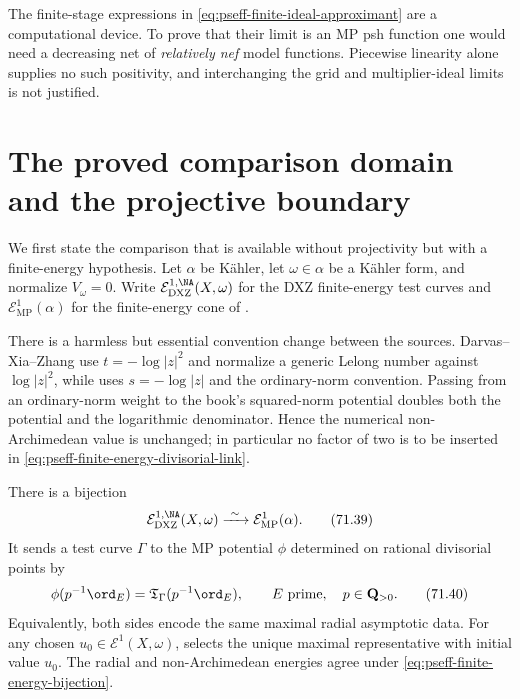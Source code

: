 \begin{remark}\label{rem:pseff-pl-limit-firewall}
The finite-stage expressions in \eqref{eq:pseff-finite-ideal-approximant}
are a
computational device.  To prove that their limit is an MP psh function
one would need a decreasing net of \emph{relatively nef} model
functions.  Piecewise linearity alone supplies no such positivity, and
interchanging the grid and multiplier-ideal limits is not justified.
\end{remark}

\section{The proved comparison domain and the projective boundary}

We first state the comparison that is available without projectivity but
with a finite-energy hypothesis.  Let \(\alpha\) be K\"ahler, let
\(\omega\in\alpha\) be a K\"ahler form, and normalize
\(V_\omega=0\).  Write
\(\mathcal E^{1,\NA}_{\mathrm{DXZ}}(X,\omega)\) for the DXZ
finite-energy test curves and \(\mathcal E^1_{\mathrm{MP}}(\alpha)\) for
the finite-energy cone of .

There is a harmless but essential convention change between the sources.
Darvas--Xia--Zhang use \(t=-\log|z|^2\) and normalize a generic Lelong
number against \(\log|z|^2\), while \cite{MP24} uses
\(s=-\log|z|\) and the ordinary-norm convention.  Passing from an
ordinary-norm weight to the book's squared-norm potential doubles both the
potential and the logarithmic denominator.  Hence the numerical
non-Archimedean value is unchanged; in particular no factor of two is to be
inserted in \eqref{eq:pseff-finite-energy-divisorial-link}.

\begin{theorem}\label{thm:pseff-kahler-finite-energy-link}
There is a bijection
\[
 \mathcal E^{1,\NA}_{\mathrm{DXZ}}(X,\omega)
 \xrightarrow{\ \sim\ }
 \mathcal E^1_{\mathrm{MP}}(\alpha).
\tag{71.39}\label{eq:pseff-finite-energy-bijection}
\]
It sends a test curve \(\Gamma\) to the MP potential \(\phi\) determined
on rational divisorial points by
\[
 \phi(p^{-1}\ord_E)
 =\mathfrak T_\Gamma(p^{-1}\ord_E),
 \qquad E\text{ prime},\quad p\in\mathbf Q_{>0}.
\tag{71.40}\label{eq:pseff-finite-energy-divisorial-link}
\]
Equivalently, both sides encode the same maximal radial asymptotic data.
For any chosen \(u_0\in\mathcal E^1(X,\omega)\),
 selects the unique maximal representative with
initial value \(u_0\).  The radial and non-Archimedean energies agree under
\eqref{eq:pseff-finite-energy-bijection}.
\end{theorem}

